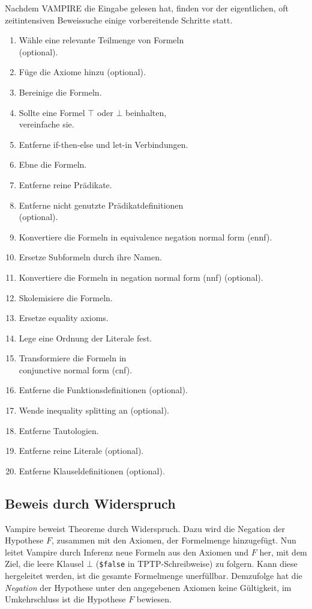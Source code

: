 \documentclass{article}
\begin{document}
Nachdem VAMPIRE die Eingabe gelesen hat, finden vor der eigentlichen, oft zeitintensiven
Beweissuche einige vorbereitende Schritte statt.

\begin{enumerate}
	\item Wähle eine relevante Teilmenge von Formeln \\(optional).
	\item Füge die Axiome hinzu (optional).
	\item Bereinige die Formeln.
	\item Sollte eine Formel $\top$ oder $\bot$ beinhalten, \\vereinfache sie.
	\item Entferne if-then-else und let-in Verbindungen.
	\item Ebne die Formeln.
	\item Entferne reine Prädikate.
	\item Entferne nicht genutzte Prädikatdefinitionen \\(optional).
	\item Konvertiere die Formeln in equivalence negation normal form (ennf).
	\item Ersetze Subformeln durch ihre Namen.
	\item Konvertiere die Formeln in negation normal form (nnf) (optional).
	\item Skolemisiere die Formeln.
	\item Ersetze equality axioms.
	\item Lege eine Ordnung der Literale fest.
	\item Transformiere die Formeln in \\conjunctive normal form (cnf).
	\item Entferne die Funktionsdefinitionen (optional).
	\item Wende inequality splitting an (optional).
	\item Entferne Tautologien.
	\item Entferne reine Literale (optional).
	\item Entferne Klauseldefinitionen (optional).
\end{enumerate}

\subsection{Beweis durch Widerspruch}
\label{subsec:refutation}

Vampire beweist Theoreme durch Widerspruch.
Dazu wird die Negation der Hypothese $F$, zusammen mit den Axiomen,
der Formelmenge hinzugefügt.
Nun leitet Vampire durch Inferenz neue Formeln aus den Axiomen und $F$ her, 
mit dem Ziel, die leere Klausel $\bot$ (\texttt{\$false} in TPTP-Schreibweise) zu folgern.
Kann diese hergeleitet werden, ist die gesamte Formelmenge unerfüllbar.
Demzufolge hat die \textit{Negation} der Hypothese unter den angegebenen Axiomen keine Gültigkeit,
im Umkehrschluss ist die Hypothese $F$ bewiesen. \cite[S. 5]{cav2013}
\end{document}

